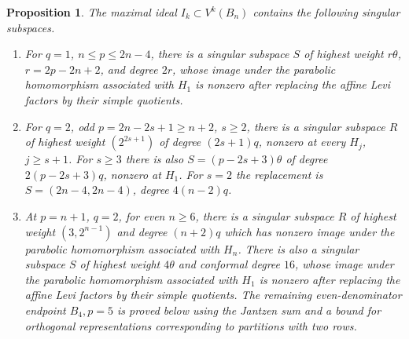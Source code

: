 \documentclass[11pt,a4paper]{amsart}
\numberwithin{equation}{section}
\newtheorem{proposition}[theorem]{Proposition}
\theoremstyle{definition}
\theoremstyle{remark}
\begin{document}
\begin{proposition}\label{seed:B-data}
The maximal ideal $I_k\subset V^k(B_n)$ contains the following
singular subspaces.
\begin{enumerate}
\item For $q=1$, $n\le p\le2n-4$, there is a singular subspace
$S$ of highest weight $r\theta$, $r=2p-2n+2$, and degree $2r$,
whose image under the parabolic homomorphism associated with $H_1$
is nonzero after replacing the affine Levi factors by their simple quotients.
\item For $q=2$, odd $p=2n-2s+1\ge n+2$, $s\ge2$, there is a singular subspace
$R$ of highest weight $(2^{2s+1})$ of degree $(2s+1)q$, nonzero at every
$H_j$, $j\ge s+1$. For $s\ge3$ there is also
$S=(p-2s+3)\theta$ of degree $2(p-2s+3)q$, nonzero at $H_1$.
For $s=2$ the replacement is $S=(2n-4,2n-4)$, degree $4(n-2)q$.
\item At $p=n+1$, $q=2$, for even $n\ge6$, there is a singular subspace
$R$ of highest weight $(3,2^{n-1})$ and degree $(n+2)q$ which has nonzero image under the parabolic homomorphism associated with $H_n$.
There is also a singular subspace $S$ of highest weight $4\theta$
and conformal degree $16$, whose image under the parabolic homomorphism
associated with $H_1$ is nonzero after replacing the affine Levi factors
by their simple quotients.
The remaining even-denominator endpoint $B_4,p=5$ is proved below
using the Jantzen sum and a bound for orthogonal representations
corresponding to partitions with two rows.
\end{enumerate}
\end{proposition}
\end{document}
